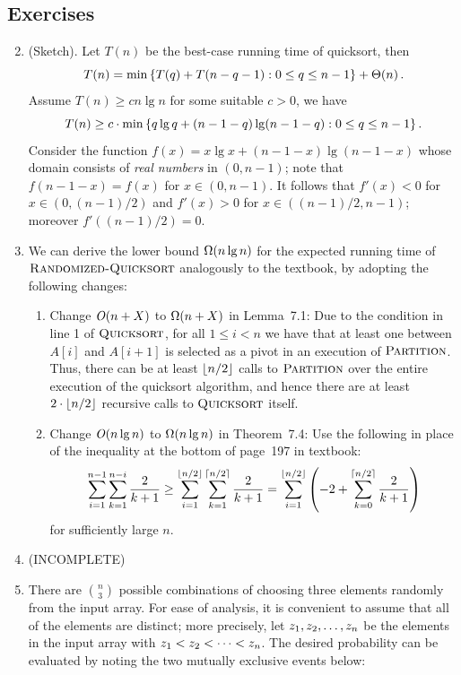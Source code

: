 \subsection*{Exercises}
\begin{enumerate}[\thesection-1]
%
\setcounter{enumi}{1}
%
\item (Sketch). Let $T(n)$ be the best-case running time of quicksort, then
\[
T(n) = \min\left\{T(q) + T(n - q - 1) : 0 \leq q \leq n - 1\right\} + \Theta\!\left(n\right).
\]
Assume $T(n) \geq c n \lg n$ for some suitable $c > 0$, we have
\[
T(n) \geq c \cdot \min\left\{q \lg q + (n - 1 - q) \lg (n - 1 - q) : 0 \leq q \leq n - 1\right\}.
\]
Consider the function $f(x) = x \lg x + (n - 1 - x) \lg (n - 1 - x)$ whose domain consists of \emph{real numbers} in $(0, n - 1)$; note that $f(n - 1 - x) = f(x)$ for $x \in (0, n - 1)$. It follows that $f'(x) < 0$ for $x \in (0, (n - 1)/2)$ and $f'(x) > 0$ for $x \in ((n - 1)/2, n - 1)$; moreover $f'((n - 1)/2) = 0$.
%
\setcounter{enumi}{3}
%
\item We can derive the lower bound $\Omega\!\left(n \lg n\right)$ for the expected running time of $\textnormal{\scshape Randomized-Quicksort}$  analogously to the textbook, by adopting the following changes:
\begin{enumerate}[(1)]
\item Change $\mathit{O}\!\left(n + X\right)$ to $\Omega\!\left(n + X\right)$ in Lemma~7.1: Due to the condition in line 1 of $\textnormal{\scshape Quicksort}$, for all $1 \leq i < n$ we have that at least one between $A[i]$ and $A[i + 1]$ is selected as a pivot in an execution of $\textnormal{\scshape Partition}$. Thus, there can be at least $\left\lfloor n / 2\right\rfloor$ calls to $\textnormal{\scshape Partition}$ over the entire execution of the quicksort algorithm, and hence there are at least $2 \cdot \left\lfloor n / 2\right\rfloor$ recursive calls to $\textnormal{\scshape Quicksort}$ itself.
\item Change $\mathit{O}\!\left(n \lg n\right)$ to $\Omega\!\left(n \lg n\right)$ in Theorem~7.4: Use the following in place of the inequality at the bottom of page~197 in textbook:
\[
{\displaystyle\sum^{n - 1}_{i = 1} \sum^{n - i}_{k = 1} \frac{2}{k + 1} \geq \sum^{\left\lfloor n / 2\right\rfloor}_{i = 1} \sum^{\left\lceil n / 2\right\rceil}_{k = 1} \frac{2}{k + 1} = \sum^{\left\lfloor n / 2\right\rfloor}_{i = 1} \left(-2 + \sum^{\left\lceil n / 2\right\rceil}_{k = 0} \frac{2}{k + 1}\right)}
\]
for sufficiently large $n$.
\end{enumerate}
%
\item (INCOMPLETE)
%
\item There are ${n \choose 3}$ possible combinations of choosing three elements randomly from the input array. For ease of analysis, it is convenient to assume that all of the elements are distinct; more precisely, let $z_1, z_2, \ldots, z_n$ be the elements in the input array with $z_1 < z_2 < \cdots < z_n$. The desired probability can be evaluated by noting the two mutually exclusive events below:

\end{enumerate}
